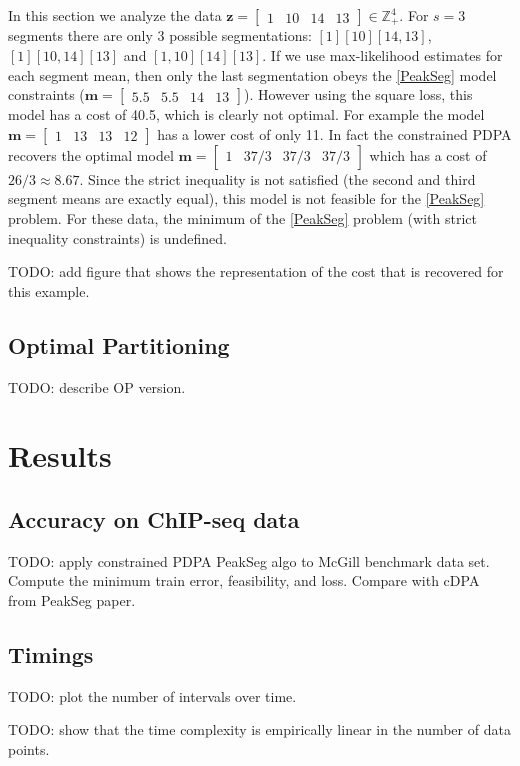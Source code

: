 \documentclass{article}
\newcommand{\ZZ}{\mathbb Z}
\begin{document}
In this section we analyze the data
$\mathbf z = \left[\begin{array}{cccc} 1 & 10 & 14 & 13
\end{array}\right]\in\ZZ_+^4
$. For $s=3$ segments there are only 3 possible segmentations:
$[1][10][14, 13]$, $[1][10, 14][13]$ and $[1, 10][14][13]$. If we use
max-likelihood estimates for each segment mean, then only the last
segmentation obeys the \ref{PeakSeg} model constraints
($\mathbf m =\left[\begin{array}{cccc} 5.5 & 5.5 & 14 &
    13\end{array}\right]$). However using the square loss, this model
has a cost of 40.5, which is clearly not optimal. For example the
model
$\mathbf m =\left[\begin{array}{cccc} 1 & 13 & 13 &
    12\end{array}\right]$ has a lower cost of only 11. In fact the
constrained PDPA recovers the optimal model
$\mathbf m =\left[\begin{array}{cccc} 1 & 37/3 & 37/3 &
    37/3\end{array}\right]$ which has a cost of $26/3\approx
8.67$. Since the strict inequality is not satisfied (the second and
third segment means are exactly equal), this model is not feasible for
the \ref{PeakSeg} problem. For these data, the minimum of the
\ref{PeakSeg} problem (with strict inequality constraints) is
undefined.

TODO: add figure that shows the representation of the cost that is
recovered for this example.

\subsection{Optimal Partitioning}

TODO: describe OP version.



\section{Results}

\subsection{Accuracy on ChIP-seq data}

TODO: apply constrained PDPA PeakSeg algo to McGill benchmark data
set. Compute the minimum train error, feasibility, and loss. Compare
with cDPA from PeakSeg paper.

\subsection{Timings}

TODO: plot the number of intervals over time.

TODO: show that the time complexity is empirically linear in the
number of data points.



\end{document}
